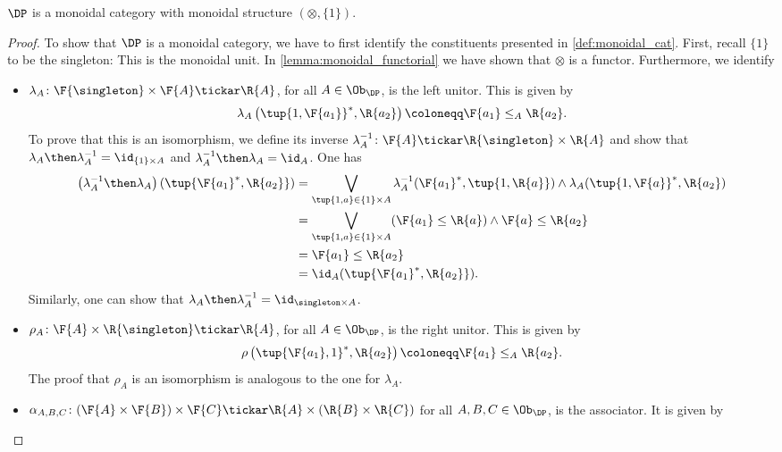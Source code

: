 \begin{lemma}
$\DP$ is a monoidal category with monoidal structure $\left(\otimes, \{1\}\right)$.
\end{lemma}
\begin{proof}
To show that $\DP$ is a monoidal category, we have to first identify the constituents presented in \cref{def:monoidal_cat}. First, recall $\{1\}$ to be the singleton: This is the monoidal unit. In \cref{lemma:monoidal_functorial} we have shown that $\otimes$ is a functor. Furthermore, we identify
\begin{itemize}
    \item $\lambda_A \colon \F{\singleton} \times \F{A} \tickar \R{A}$, for all $A\in \Ob_\DP$, is the left unitor. This is given by
    \begin{equation}
        \lambda_A\left( \tup{1,\F{a_1}}^*,\R{a_2}\right)\coloneqq \F{a_1}\leq_A \R{a_2}.
    \end{equation}
    To prove that this is an isomorphism, we define its inverse $\lambda_A^{-1}\colon \F{A}\tickar \R{\singleton} \times \R{A}$ and show that $\lambda_A\then \lambda_A^{-1}=\id_{\{1\}\times A}$ and $\lambda_A^{-1}\then \lambda_A=\id_{A}$. One has
    \begin{equation}
        \begin{aligned}
           \left( \lambda_A^{-1}\then \lambda_A\right)(\tup{\F{a_1}^*,\R{a_2}})&= \bigvee_{\tup{1,a}\in  \{1\}\times A} \lambda_A^{-1}(\F{a_1}^*,\tup{1,\R{a}})\wedge \lambda_A(\tup{1,\F{a}}^*,\R{a_2})\\
           &= \bigvee_{\tup{1,a}\in  \{1\}\times A}(\F{a_1}\leq \R{a}) \wedge \F{a}\leq \R{a_2}\\
           &=\F{a_1}\leq \R{a_2}\\
           &=\id_A(\tup{\F{a_1}^*,\R{a_2}}).
        \end{aligned}
    \end{equation}
    Similarly, one can show that $\lambda_A\then \lambda_A^{-1}=\id_{\singleton \times A}$.
    \item $\rho_A\colon \F{A} \times \R{\singleton} \tickar \R{A}$, for all $A\in \Ob_\DP$, is the right unitor. This is given by 
    \begin{equation}
        \rho\left( \tup{\F{a_1},1}^*,\R{a_2}\right)\coloneqq \F{a_1}\leq_A \R{a_2}.
    \end{equation}
    The proof that $\rho_A$ is an isomorphism is analogous to the one for $\lambda_A$.
    \item $\alpha_{A,B,C}\colon (\F{A}\times \F{B})\times \F{C} \tickar \R{A} \times (\R{B}\times \R{C})$ for all $A,B,C \in \Ob_\DP$, is the associator. It is given by

\end{itemize}
\end{proof}
